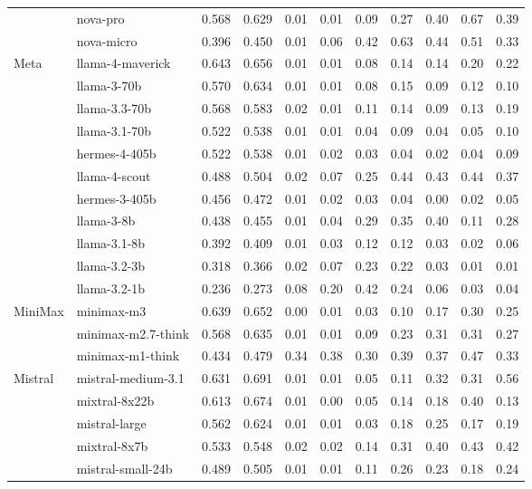 \begin{longtable}{@{}ll rr rrrrrrr@{}}
 & nova-pro & 0.568 & 0.629 & 0.01 & 0.01 & 0.09 & 0.27 & 0.40 & 0.67 & 0.39 \\
 & nova-micro & 0.396 & 0.450 & 0.01 & 0.06 & 0.42 & 0.63 & 0.44 & 0.51 & 0.33 \\
Meta & llama-4-maverick & 0.643 & 0.656 & 0.01 & 0.01 & 0.08 & 0.14 & 0.14 & 0.20 & 0.22 \\
 & llama-3-70b & 0.570 & 0.634 & 0.01 & 0.01 & 0.08 & 0.15 & 0.09 & 0.12 & 0.10 \\
 & llama-3.3-70b & 0.568 & 0.583 & 0.02 & 0.01 & 0.11 & 0.14 & 0.09 & 0.13 & 0.19 \\
 & llama-3.1-70b & 0.522 & 0.538 & 0.01 & 0.01 & 0.04 & 0.09 & 0.04 & 0.05 & 0.10 \\
 & hermes-4-405b & 0.522 & 0.538 & 0.01 & 0.02 & 0.03 & 0.04 & 0.02 & 0.04 & 0.09 \\
 & llama-4-scout & 0.488 & 0.504 & 0.02 & 0.07 & 0.25 & 0.44 & 0.43 & 0.44 & 0.37 \\
 & hermes-3-405b & 0.456 & 0.472 & 0.01 & 0.02 & 0.03 & 0.04 & 0.00 & 0.02 & 0.05 \\
 & llama-3-8b & 0.438 & 0.455 & 0.01 & 0.04 & 0.29 & 0.35 & 0.40 & 0.11 & 0.28 \\
 & llama-3.1-8b & 0.392 & 0.409 & 0.01 & 0.03 & 0.12 & 0.12 & 0.03 & 0.02 & 0.06 \\
 & llama-3.2-3b & 0.318 & 0.366 & 0.02 & 0.07 & 0.23 & 0.22 & 0.03 & 0.01 & 0.01 \\
 & llama-3.2-1b & 0.236 & 0.273 & 0.08 & 0.20 & 0.42 & 0.24 & 0.06 & 0.03 & 0.04 \\
MiniMax & minimax-m3 & 0.639 & 0.652 & 0.00 & 0.01 & 0.03 & 0.10 & 0.17 & 0.30 & 0.25 \\
 & minimax-m2.7-think & 0.568 & 0.635 & 0.01 & 0.01 & 0.09 & 0.23 & 0.31 & 0.31 & 0.27 \\
 & minimax-m1-think & 0.434 & 0.479 & 0.34 & 0.38 & 0.30 & 0.39 & 0.37 & 0.47 & 0.33 \\
Mistral & mistral-medium-3.1 & 0.631 & 0.691 & 0.01 & 0.01 & 0.05 & 0.11 & 0.32 & 0.31 & 0.56 \\
 & mixtral-8x22b & 0.613 & 0.674 & 0.01 & 0.00 & 0.05 & 0.14 & 0.18 & 0.40 & 0.13 \\
 & mistral-large & 0.562 & 0.624 & 0.01 & 0.01 & 0.03 & 0.18 & 0.25 & 0.17 & 0.19 \\
 & mixtral-8x7b & 0.533 & 0.548 & 0.02 & 0.02 & 0.14 & 0.31 & 0.40 & 0.43 & 0.42 \\
 & mistral-small-24b & 0.489 & 0.505 & 0.01 & 0.01 & 0.11 & 0.26 & 0.23 & 0.18 & 0.24 \\

\end{longtable}
